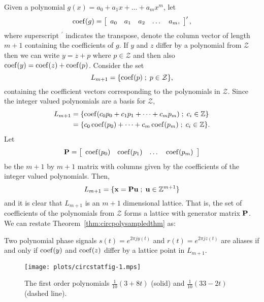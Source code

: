 \documentclass[journal]{IEEEtran}
\begin{document}
Given a polynomial $g(x) = a_0 + a_1x + \dots + a_m x^m$, let
\[
\operatorname{coef}(g) = \left[ \begin{array}{ccccc} a_0 & a_1 & a_2 & \dots & a_m, \end{array} \right]^\prime,
\]
where superscript $^\prime$ indicates the transpose, denote the column vector of length $m+1$ containing the coefficients of $g$.  If $y$ and $z$ differ by a polynomial from $\mathcal{Z}$ then we can write $y = z + p$ where $p \in \mathcal{Z}$ and then also $\operatorname{coef}(y) = \operatorname{coef}(z) + \operatorname{coef}(p)$.
  Consider the set
\[
L_{m+1} = \{ \operatorname{coef}(p) \; ; \; p \in \mathcal{Z} \},
\]
containing the coefficient vectors corresponding to the polynomials in $\mathcal{Z}$.  Since the integer valued polynomials are a basis for $\mathcal{Z}$,
\begin{align*}
L_{m+1} &= \{ \operatorname{coef}(c_0 p_0 + c_1p_1 + \dots + c_mp_m) \; ; \; c_i \in {\mathbb Z} \} \\
&= \{ c_0 \operatorname{coef}(p_0) + \dots + c_m\operatorname{coef}(p_m) \; ; \; c_i \in {\mathbb Z} \}.
\end{align*}
Let
\[
\mathbf{P} = \left[ \begin{array}{cccc} \operatorname{coef}(p_0)& \operatorname{coef}(p_1)& \dots& \operatorname{coef}(p_m)  \end{array} \right]
\]
be the $m+1$ by $m+1$ matrix with columns given by the coefficients of the integer valued polynomials.  Then,
\[
L_{m+1} = \{ \mathbf{x} = \mathbf{P}\mathbf{u} \; ; \; \mathbf{u} \in {\mathbb Z}^{m+1} \}
\]
and it is clear that $L_{m+1}$ is an $m+1$ dimensional lattice.  That is, the set of coefficients of the polynomials from $\mathcal{Z}$ forms a lattice with generator matrix $\mathbf{P}$. We can restate Theorem~\ref{thm:circpolysampledthm} as:
\begin{corollary}\label{cor:circpolysampledcoef}
Two polynomial phase signals $s(t) = e^{2\pi j y(t)}$  and $r(t) = e^{2\pi j z(t)}$ are aliases if and only if $\operatorname{coef}(y)$ and $\operatorname{coef}(z)$ differ by a lattice point in $L_{m+1}$.
\end{corollary}


\begin{figure}[tp]
	\centering
		\texttt{[image: plots/circstatfig-1.mps]}
		\caption{The first order polynomials $\tfrac{1}{10}(3 + 8t)$ (solid) and $\tfrac{1}{10}(33 - 2t)$ (dashed line).}
		\label{fig:circstatplot_line}
\end{figure}
\end{document}
